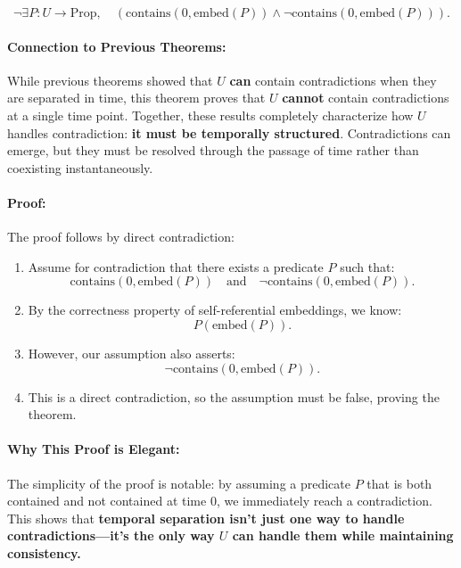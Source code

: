 \documentclass[12pt]{article}
\begin{document}
\begin{equation}
    \neg \exists P: U \to \text{Prop}, \quad
    \left( \text{contains}(0, \text{embed}(P)) \wedge \neg \text{contains}(0, \text{embed}(P)) \right).
\end{equation}

\paragraph{Connection to Previous Theorems:}
While previous theorems showed that \( U \) \textbf{can} contain contradictions when they are separated in time, this theorem proves that \( U \) \textbf{cannot} contain contradictions at a single time point. Together, these results completely characterize how \( U \) handles contradiction: \textbf{it must be temporally structured}. Contradictions can emerge, but they must be resolved through the passage of time rather than coexisting instantaneously.

\paragraph{Proof:}
The proof follows by direct contradiction:

\begin{enumerate}
    \item Assume for contradiction that there exists a predicate \( P \) such that:
    \[
    \text{contains}(0, \text{embed}(P)) \quad \text{and} \quad \neg \text{contains}(0, \text{embed}(P)).
    \]
    \item By the correctness property of self-referential embeddings, we know:
    \[
    P(\text{embed}(P)).
    \]
    \item However, our assumption also asserts:
    \[
    \neg \text{contains}(0, \text{embed}(P)).
    \]
    \item This is a direct contradiction, so the assumption must be false, proving the theorem.
\end{enumerate}

\paragraph{Why This Proof is Elegant:}
The simplicity of the proof is notable: by assuming a predicate \( P \) that is both contained and not contained at time \( 0 \), we immediately reach a contradiction. This shows that \textbf{temporal separation isn’t just one way to handle contradictions—it’s the only way \( U \) can handle them while maintaining consistency.}
\end{document}
